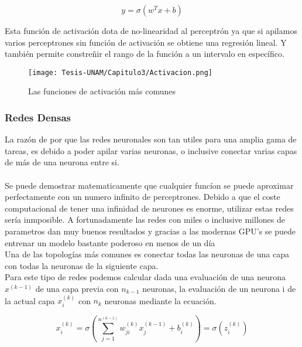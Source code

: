 \begin{equation}
    y = \sigma(w^Tx+b)
\end{equation}

Esta función de activación dota de no-linearidad al perceptrón ya que si apilamos varios perceptrones sin función de activación se obtiene una regresión lineal.\cite{Aggarwal2024DeepLearning} Y también permite constreñir el rango de la función a un intervalo en específico.

\begin{figure}[h!]
    \centering
    \texttt{[image: Tesis-UNAM/Capitulo3/Activacion.png]}
    \caption{Las funciones de activación más comunes}
    \label{fig:enter-label}
\end{figure}
\subsubsection{Redes Densas}
La razón de por que las redes neuronales son tan utiles para una amplia gama de tareas, es debido a poder apilar varias neuronas, o inclusive conectar varias capas de más de una neurona entre si.\\\\
Se puede demostrar matematicamente que cualquier funcíon se puede aproximar perfectamente con un numero infinito de perceptrones\cite{Aggarwal2024DeepLearning}. Debido a que el coste computacional de tener una infinidad de neurones es enorme, utilizar estas redes sería inmposible. A fortunadamente las redes con miles o inclusive millones de parametros dan muy buenos resultados y gracias a las modernas GPU's se puede entrenar un modelo bastante poderoso en menos de un día\\

Una de las topologías más comunes es conectar todas las neuronas de una capa con todas la neuronas de la siguiente capa.\\

Para este tipo de redes podemos calcular dada una evaluación de una neurona $x^{\left( k-1 \right)}$ de una capa previa con $n_{k-1}$ neuronas, la evaluación de un neurona i de la actual capa $x_i^{\left( k \right)}$ con $n_k$ neuronas mediante la ecuación.\cite{Aggarwal2024DeepLearning, Beyer}

\begin{equation}
    x_i^{\left( k \right)} = \sigma \left( \sum_{j=1}^{n^{\left( k-1 \right)}} w_{ji}^{\left( k \right)}x_j^{\left(k-1 \right)} + b_i^{\left( k\right)}\right) = \sigma(z_i^{(k)})
\end{equation}

